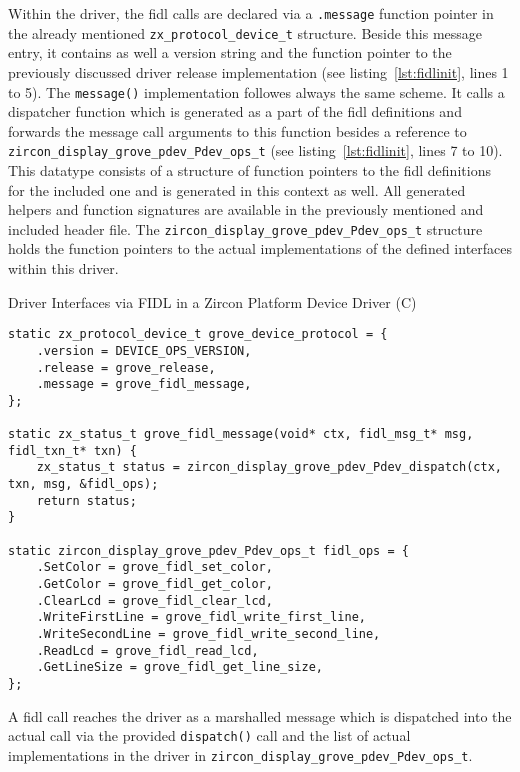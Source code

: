 Within the driver, the \ac{fidl} calls are declared via a \texttt{.message} function pointer in the already mentioned \texttt{zx_protocol_device_t} structure.
Beside this message entry, it contains as well a version string and the function pointer to the previously discussed driver release implementation (see listing~\ref{lst:fidlinit}, lines 1 to 5).
The \texttt{message()} implementation followes always the same scheme.
It calls a dispatcher function which is generated as a part of the \ac{fidl} definitions and forwards the message call arguments to this function besides a reference to \texttt{zircon_display_grove_pdev_Pdev_ops_t} (see listing~\ref{lst:fidlinit}, lines 7 to 10).
This datatype consists of a structure of function pointers to the \ac{fidl} definitions for the included one and is generated in this context as well. 
All generated helpers and function signatures are available in the previously mentioned and included header file.
The \texttt{zircon_display_grove_pdev_Pdev_ops_t} structure holds the function pointers to the actual implementations of the defined interfaces within this driver.

\begin{listing} [H]
    \caption{Driver Interfaces via FIDL in a Zircon Platform Device Driver (C)}
\label{lst:fidlinit}
\begin{verbatim}
static zx_protocol_device_t grove_device_protocol = {
    .version = DEVICE_OPS_VERSION,
    .release = grove_release,
    .message = grove_fidl_message,
};

static zx_status_t grove_fidl_message(void* ctx, fidl_msg_t* msg, fidl_txn_t* txn) {
    zx_status_t status = zircon_display_grove_pdev_Pdev_dispatch(ctx, txn, msg, &fidl_ops);
    return status;
}

static zircon_display_grove_pdev_Pdev_ops_t fidl_ops = {
    .SetColor = grove_fidl_set_color,
    .GetColor = grove_fidl_get_color,
    .ClearLcd = grove_fidl_clear_lcd,
    .WriteFirstLine = grove_fidl_write_first_line,
    .WriteSecondLine = grove_fidl_write_second_line,
    .ReadLcd = grove_fidl_read_lcd,
    .GetLineSize = grove_fidl_get_line_size,
};
\end{verbatim}
\end{listing}

A \ac{fidl} call reaches the driver as a marshalled message which is dispatched into the actual call via the provided \texttt{dispatch()} call and the list of actual implementations in the driver in \texttt{zircon_display_grove_pdev_Pdev_ops_t}.


